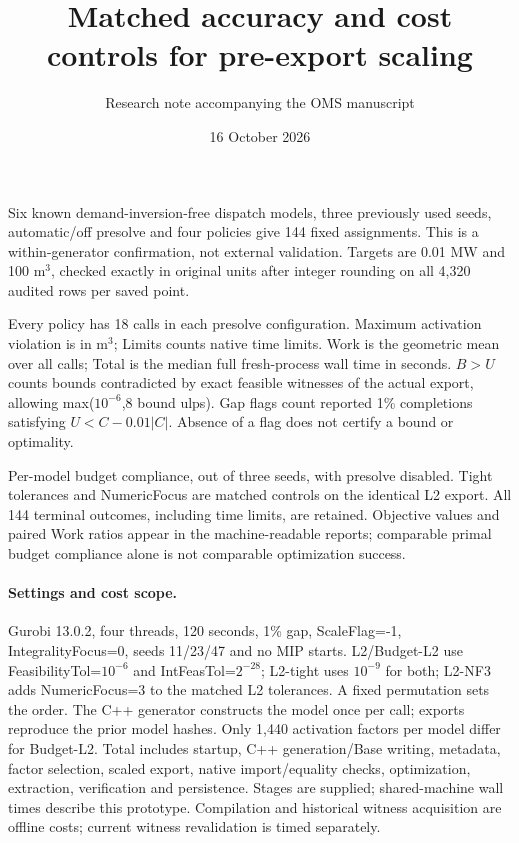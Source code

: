 \documentclass[11pt]{article}
\title{Matched accuracy and cost controls for pre-export scaling}
\author{Research note accompanying the OMS manuscript}
\date{16 October 2026}
\begin{document}
\maketitle
Six known demand-inversion-free dispatch models, three previously used seeds,
automatic/off presolve and four policies give 144 fixed assignments. This is a
within-generator confirmation, not external validation. Targets are 0.01 MW and
100 m$^3$, checked exactly in original units after integer rounding on all 4,320
audited rows per saved point.

\begin{center}\resizebox{\linewidth}{!}{}\end{center}
Every policy has 18 calls in each presolve configuration. Maximum activation
violation is in m$^3$; Limits counts native time limits. Work is the geometric mean
over all calls; Total is the median full fresh-process wall time in seconds.
$B>U$ counts bounds contradicted by exact feasible witnesses of the actual export,
allowing max($10^{-6}$,8 bound ulps). Gap flags count reported 1\% completions
satisfying $U<C-0.01|C|$. Absence of a flag does not certify a bound or optimality.

\begin{center}\end{center}
Per-model budget compliance, out of three seeds, with presolve disabled. Tight
tolerances and NumericFocus are matched controls on the identical L2 export.
All 144 terminal outcomes, including time limits, are retained. Objective values
and paired Work ratios appear in the machine-readable reports; comparable primal
budget compliance alone is not comparable optimization success.

\paragraph{Settings and cost scope.}
Gurobi 13.0.2, four threads, 120 seconds, 1\% gap, ScaleFlag=-1,
IntegralityFocus=0, seeds 11/23/47 and no MIP starts. L2/Budget-L2 use
FeasibilityTol=$10^{-6}$ and IntFeasTol=$2^{-28}$; L2-tight uses $10^{-9}$ for
both; L2-NF3 adds NumericFocus=3 to the matched L2 tolerances. A fixed permutation
sets the order. The C++ generator constructs the model once per call; exports reproduce
the prior model hashes. Only 1,440 activation factors per model differ for Budget-L2.
Total includes startup, C++ generation/Base writing, metadata, factor selection,
scaled export, native import/equality checks, optimization, extraction, verification
and persistence. Stages are supplied; shared-machine wall times describe this
prototype. Compilation and historical witness acquisition are offline costs;
current witness revalidation is timed separately.
\end{document}
